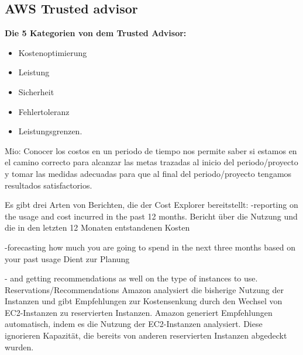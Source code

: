 
\subsection{AWS Trusted advisor}

\textbf{Die 5 Kategorien von dem Trusted Advisor:}

\begin{itemize}
  \item
        Kostenoptimierung

  \item
        Leistung
  \item
        Sicherheit
  \item
        Fehlertoleranz
  \item
        Leistungsgrenzen.
\end{itemize}\textbf{}
Mio:
Conocer los costos en un periodo de tiempo nos permite saber si estamos en el camino correcto para alcanzar las metas trazadas al inicio del periodo/proyecto y tomar las medidas adecuadas para que al final del periodo/proyecto tengamos resultados satisfactorios.

Es gibt drei Arten von Berichten, die der Cost Explorer bereitstellt:
-reporting on the usage and cost incurred in the past 12 months.
Bericht über die Nutzung und die in den letzten 12 Monaten entstandenen Kosten

-forecasting how much you are going to spend in the next three months based on your past usage
Dient zur Planung  

- and getting recommendations as well on the type of instances to use.
Reservations/Recommendations 
Amazon analysiert die bisherige Nutzung der Instanzen und gibt Empfehlungen zur Kostensenkung durch den Wechsel von EC2-Instanzen zu reservierten Instanzen.
Amazon generiert Empfehlungen automatisch, indem es die Nutzung der EC2-Instanzen analysiert. 
Diese ignorieren Kapazität, die bereits von anderen reservierten Instanzen abgedeckt wurden.

